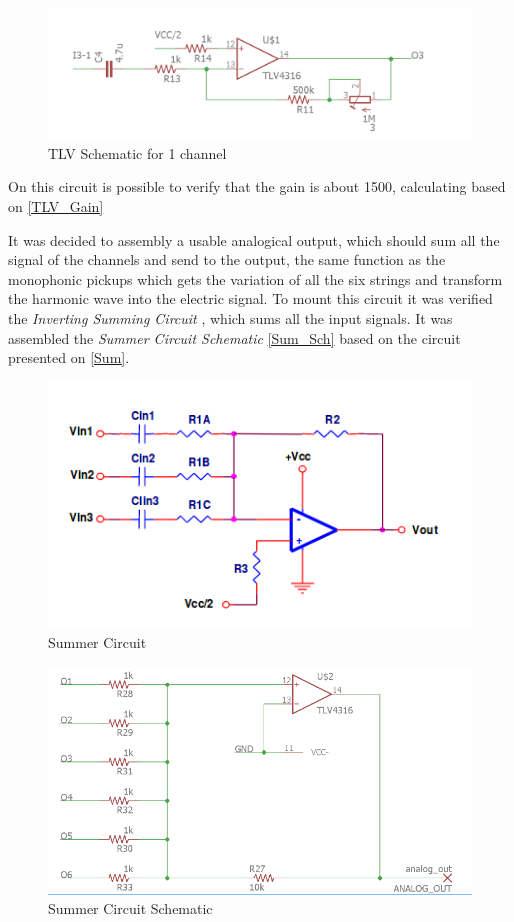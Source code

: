 \begin{figure}[!htpb]
\centering
\caption{TLV Schematic for 1 channel}
\label{TLC_Sch}
\includegraphics[scale=0.4]{images/TLV_1ch}
\end{figure}

On this circuit is possible to verify that the gain is about 1500, calculating based on \autoref{TLV_Gain}

It was decided to assembly a usable analogical output, which should sum all the signal of the channels and send to the output, the same function as the monophonic pickups which gets
the variation of all the six strings and transform the harmonic wave into the electric signal. To mount this circuit it was verified the \textit{Inverting Summing Circuit} \cite{OpAmps},
which sums all the input signals. It was assembled the \textit{Summer Circuit Schematic} \autoref{Sum_Sch} based on the circuit presented on \autoref{Sum}.

\begin{figure}[!htpb]
\centering
\caption{Summer Circuit}
\label{Sum}
\includegraphics[scale=1]{images/sum}
\end{figure}

\begin{figure}[!htpb]
\centering
\caption{Summer Circuit Schematic}
\label{Sum_Sch}
\includegraphics[scale=0.4]{images/tlv_sum}
\end{figure}

